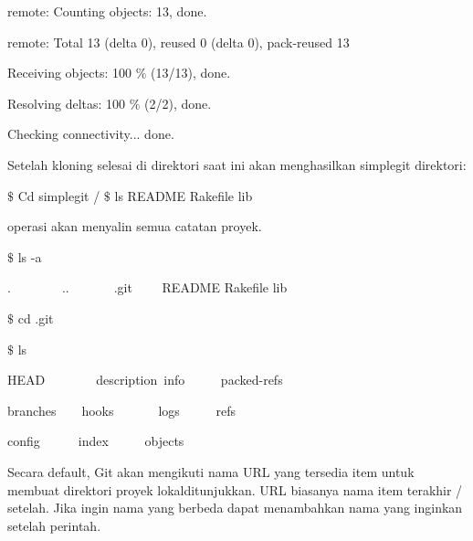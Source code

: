 \noindent 
{\fontsize{10pt}{10pt}\selectfont remote: Counting objects: 13, done.} \par
\noindent 
{\fontsize{10pt}{10pt}\selectfont remote: Total 13 (delta 0), reused 0 (delta 0), pack-reused 13} \par
\noindent 
{\fontsize{10pt}{10pt}\selectfont Receiving objects: 100 $  \%  $ (13/13), done.} \par
\noindent 
{\fontsize{10pt}{10pt}\selectfont Resolving deltas: 100 $  \%  $ (2/2), done.} \par
\noindent 
{\fontsize{10pt}{10pt}\selectfont Checking connectivity... done.} \par
\vspace{12pt}
\noindent 
Setelah kloning selesai di direktori saat ini akan menghasilkan simplegit direktori:  \par
\noindent 
{\fontsize{10pt}{10pt}\selectfont  $  \$  $ Cd simplegit /  $  \$  $ ls README Rakefile lib } \par
\noindent 
operasi akan menyalin semua catatan proyek.  \par
\vspace{12pt}
\noindent 
{\fontsize{10pt}{10pt}\selectfont  $  \$  $ ls -a} \par
\noindent 
{\fontsize{10pt}{10pt}\selectfont .~~~~~~~~..~~~~~~~.git~~~~ README   Rakefile lib} \par
\noindent 
{\fontsize{10pt}{10pt}\selectfont  $  \$  $ cd .git} \par
\noindent 
{\fontsize{10pt}{10pt}\selectfont  $  \$  $ ls} \par
\noindent 
{\fontsize{10pt}{10pt}\selectfont HEAD~~~~~~~~description~info~~~~~   packed-refs} \par
\noindent 
{\fontsize{10pt}{10pt}\selectfont branches~~~~hooks~~~~~~~logs~~~~~   refs} \par
\noindent 
{\fontsize{10pt}{10pt}\selectfont config~~~~~~index~~~~~  objects} \par
\noindent 
\vspace{10pt}
\noindent 
\vspace{10pt}
\noindent 
 \hspace*{0.64in} Secara default, Git akan mengikuti nama URL yang tersedia item untuk membuat direktori proyek lokalditunjukkan. URL biasanya nama item terakhir / setelah. Jika ingin nama yang berbeda  dapat menambahkan nama yang inginkan setelah perintah. \par
\noindent 
\vspace{12pt}
\noindent 
